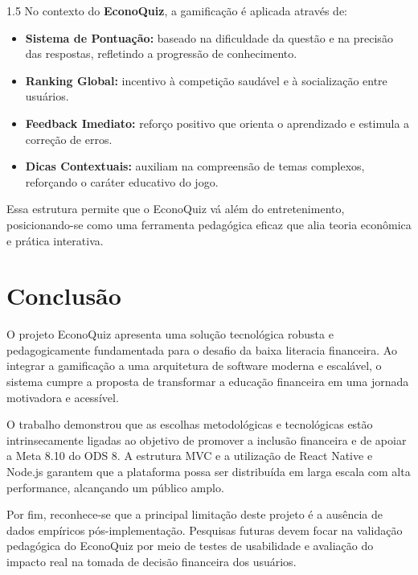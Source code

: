 \documentclass[a4paper, 12pt]{article}
\begin{document}
\begin{spacing}{1.5}
No contexto do \textbf{EconoQuiz}, a gamificação é aplicada através de:
\begin{itemize}
\item \textbf{Sistema de Pontuação:} baseado na dificuldade da questão e na precisão das respostas, refletindo a progressão de conhecimento.
\item \textbf{Ranking Global:} incentivo à competição saudável e à socialização entre usuários.
\item \textbf{Feedback Imediato:} reforço positivo que orienta o aprendizado e estimula a correção de erros.
\item \textbf{Dicas Contextuais:} auxiliam na compreensão de temas complexos, reforçando o caráter educativo do jogo.
\end{itemize}

Essa estrutura permite que o EconoQuiz vá além do entretenimento, posicionando-se como uma ferramenta pedagógica eficaz que alia teoria econômica e prática interativa.

\section*{Conclusão}

O projeto EconoQuiz apresenta uma solução tecnológica robusta e pedagogicamente fundamentada para o desafio da baixa literacia financeira. Ao integrar a gamificação a uma arquitetura de software moderna e escalável, o sistema cumpre a proposta de transformar a educação financeira em uma jornada motivadora e acessível.

O trabalho demonstrou que as escolhas metodológicas e tecnológicas estão intrinsecamente ligadas ao objetivo de promover a inclusão financeira e de apoiar a Meta 8.10 do ODS 8. A estrutura MVC e a utilização de React Native e Node.js garantem que a plataforma possa ser distribuída em larga escala com alta performance, alcançando um público amplo.

Por fim, reconhece-se que a principal limitação deste projeto é a ausência de dados empíricos pós-implementação. Pesquisas futuras devem focar na validação pedagógica do EconoQuiz por meio de testes de usabilidade e avaliação do impacto real na tomada de decisão financeira dos usuários.



\end{spacing}
\end{document}
